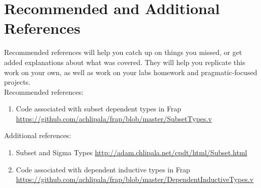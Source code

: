 \documentclass{article}
\begin{document}
\section{Recommended and Additional References}

Recommended references will help you catch up on things you missed, or get added explanations about what was covered. They will help you replicate this work on your own, as well as work on your labs homework and pragmatic-focused projects. \\

Recommended references:
\begin{enumerate}
    \item Code associated with subset dependent types in Frap \\
    \href{https://github.com/achlipala/frap/blob/master/SubsetTypes.v}{https://github.com/achlipala/frap/blob/master/SubsetTypes.v}
\end{enumerate}

Additional references:
\begin{enumerate}
    \item Subset and Sigma Types \href{http://adam.chlipala.net/cpdt/html/Subset.html}{http://adam.chlipala.net/cpdt/html/Subset.html}
    \item Code associated with dependent inductive types in Frap \\
    \href{https://github.com/achlipala/frap/blob/master/DependentInductiveTypes.v}{https://github.com/achlipala/frap/blob/master/DependentInductiveTypes.v}
\end{enumerate}




\end{document}
